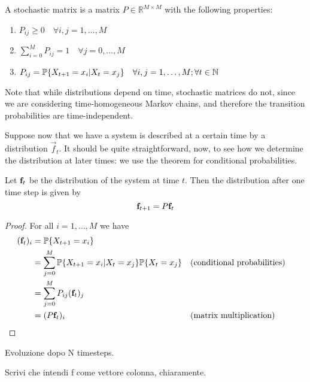 \begin{ndef} 
    A stochastic matrix is a matrix $P \in \mathbb{R}^{M\times M}$ with the following properties:
    \begin{center}
        \begin{enumerate}
            \item $P_{ij} \geq 0 \quad \forall i,j = 1,\dots,M$
            \item $\sum_{i = 0}^M P_{ij} = 1 \quad \forall j = 0,\dots,M$ 
            \item $P_{ij} = \mathbb{P}\{X_{t+1} = x_i | X_t = x_j \} \quad \forall i,j = 1,\dots,M; \forall t\in \mathbb N$
        \end{enumerate}
    \end{center}
\end{ndef}

Note that while distributions depend on time, stochastic matrices do not, since we are considering time-homogeneous Markov chains, and therefore the transition probabilities are time-independent.

Suppose now that we have a system is described at a certain time by a distribution $\vec{f}_t$. It should be quite straightforward, now, to see how we determine the distribution at later times: we use the theorem for conditional probabilities.
\begin{theorem}
    Let $\mathbf{f}_t$ be the distribution of the system at time $t$. Then the distribution after one time step is given by
    \begin{equation}
        \mathbf{f}_{t+1} = P \mathbf{f}_t
    \end{equation}
\end{theorem}
\begin{proof}
    For all $i = 1,\dots,M$ we have
    \begin{align}
        (\mathbf{f}_t)_i 
            & = \mathbb{P}\{X_{t+1} = x_i \} \\
            & = \sum_{j = 0}^M \mathbb{P}\{X_{t+1} = x_i | X_t = x_j\} \mathbb{P}\{X_t = x_j\} && \text{(conditional probabilities)}\\
            & = \sum_{j = 0}^M P_{ij} (\mathbf{f}_t)_j\\
            & = (P \mathbf{f}_t)_i && \text{(matrix multiplication)}
    \end{align}

\end{proof}

\begin{corollary}
    Evoluzione dopo N timesteps.
\end{corollary}

\begin{remark}
    Scrivi che intendi f come vettore colonna, chiaramente.
\end{remark}
